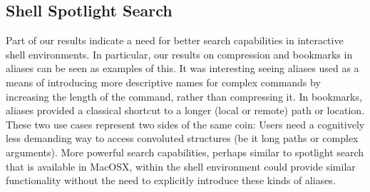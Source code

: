 \subsection{Shell Spotlight Search}

Part of our results indicate a need for better search capabilities in interactive shell environments.
In particular, our results on compression and bookmarks in aliases can be seen as examples of this. 
It was interesting seeing aliases used as a means of introducing more descriptive names for complex commands by increasing the length of the command, rather than compressing it.
In bookmarks, aliases provided a classical shortcut to a longer (local or remote) path or location.
These two use cases represent two sides of the same coin: Users need a cognitively less demanding way to access convoluted structures (be it long paths or complex arguments).
More powerful search capabilities, perhaps similar to spotlight search that is available in MacOSX, within the shell environment could provide similar functionality without the need to explicitly introduce these kinds of aliases.




